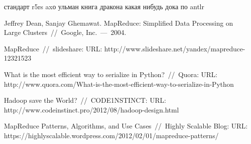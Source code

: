 \documentclass[12pt,a4paper,oneside]{extarticle}
\begin{document}
\begin{thebibliography}{0}
     стандарт r5rs
     axо ульман книга дракона
     какая нибудь дока по antlr

        Jeffrey Dean, Sanjay Ghemawat. MapReduce: Simplified Data Processing on Large Clusters~//~Google, Inc.~---~2004.

        MapReduce~//~slideshare: URL: \newline
        http://www.slideshare.net/yandex/mapreduce-12321523

        What is the most efficient way to serialize in Python?~//~Quora: URL:  \newline
        http://www.quora.com/What-is-the-most-efficient-way-to-serialize-in-Python

        Hadoop save the World?~//~CODE1NSTINCT: URL:  \newline
        http://www.codeinstinct.pro/2012/08/hadoop-design.html

        MapReduce Patterns, Algorithms, and Use Cases~//~Highly Scalable Blog: URL:  \newline
        https://highlyscalable.wordpress.com/2012/02/01/mapreduce-patterns/
        
\end{thebibliography}
\end{document}
